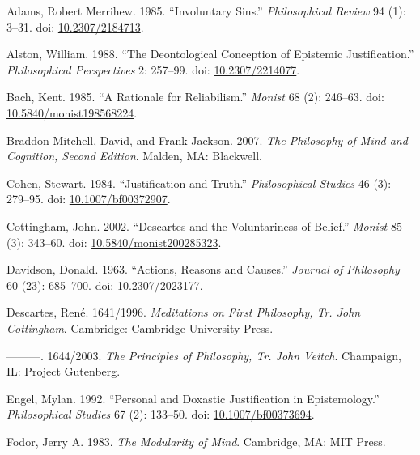 \documentclass[
  10pt,
  letterpaper,
  DIV=11,
  numbers=noendperiod,
  twoside]{scrartcl}
\newlength{\cslhangindent}
\newenvironment{CSLReferences}[2] %
 {\begin{list}{}{%
  \setlength{\itemindent}{0pt}
  \setlength{\leftmargin}{0pt}
  \setlength{\parsep}{0pt}
  \ifodd #1
   \setlength{\leftmargin}{\cslhangindent}
   \setlength{\itemindent}{-1\cslhangindent}
  \fi
  \setlength{\itemsep}{#2\baselineskip}}}
 {\end{list}}
\begin{document}
\label{refs}
\begin{CSLReferences}{1}{0}
Adams, Robert Merrihew. 1985. {``Involuntary Sins.''}
\emph{Philosophical Review} 94 (1): 3--31. doi:
\href{https://doi.org/10.2307/2184713}{10.2307/2184713}.

Alston, William. 1988. {``The Deontological Conception of Epistemic
Justification.''} \emph{Philosophical Perspectives} 2: 257--99. doi:
\href{https://doi.org/10.2307/2214077}{10.2307/2214077}.

Bach, Kent. 1985. {``A Rationale for Reliabilism.''} \emph{Monist} 68
(2): 246--63. doi:
\href{https://doi.org/10.5840/monist198568224}{10.5840/monist198568224}.

Braddon-Mitchell, David, and Frank Jackson. 2007. \emph{The Philosophy
of Mind and Cognition, {Second Edition}}. Malden, MA: Blackwell.

Cohen, Stewart. 1984. {``Justification and Truth.''} \emph{Philosophical
Studies} 46 (3): 279--95. doi:
\href{https://doi.org/10.1007/bf00372907}{10.1007/bf00372907}.

Cottingham, John. 2002. {``Descartes and the Voluntariness of Belief.''}
\emph{Monist} 85 (3): 343--60. doi:
\href{https://doi.org/10.5840/monist200285323}{10.5840/monist200285323}.

Davidson, Donald. 1963. {``Actions, Reasons and Causes.''} \emph{Journal
of Philosophy} 60 (23): 685--700. doi:
\href{https://doi.org/10.2307/2023177}{10.2307/2023177}.

Descartes, René. 1641/1996. \emph{Meditations on First Philosophy, {Tr.
John Cottingham}}. Cambridge: Cambridge University Press.

---------. 1644/2003. \emph{The Principles of Philosophy, {Tr. John
Veitch}}. Champaign, IL: Project Gutenberg.

Engel, Mylan. 1992. {``Personal and Doxastic Justification in
Epistemology.''} \emph{Philosophical Studies} 67 (2): 133--50. doi:
\href{https://doi.org/10.1007/bf00373694}{10.1007/bf00373694}.

Fodor, Jerry A. 1983. \emph{The Modularity of Mind}. Cambridge, MA: MIT
Press.


\end{CSLReferences}
\end{document}
